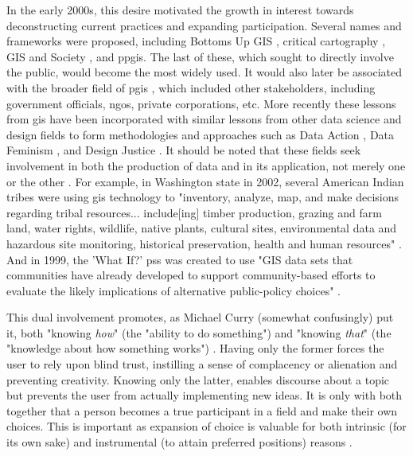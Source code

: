 In the early 2000s, this desire motivated the growth in interest towards deconstructing current practices and expanding participation. Several names and frameworks were proposed, including Bottoms Up GIS \cite{talenBottomUpGIS2000}, critical cartography \cite{cramptonIntroductionCriticalCartography2005, kimCriticalCartographyParticipatory2015}, GIS and Society \cite{sieberPublicParticipationGeographic2006}, and \ac{ppgis}. The last of these, which sought to directly involve the public, would become the most widely used. It would also later be associated with the broader field of \ac{pgis} \cite{sieberPublicParticipationGeographic2006}, which included other stakeholders, including government officials, \acp{ngo}, private corporations, etc. More recently these lessons from \ac{gis} have been incorporated with similar lessons from other data science and design fields to form methodologies and approaches such as Data Action \cite{williamsDataActionUsing2020}, Data Feminism \cite{dignazioDataFeminism2020}, and Design Justice \cite{costanza-chockDesignJusticeCommunityLed2020}. It should be noted that these fields seek involvement in both the production of data and in its application, not merely one or the other \cite{weinerParticipatoryGeographicInformation2007, talenBottomUpGIS2000}. For example, in Washington state in 2002, several American Indian tribes were using \ac{gis} technology to "inventory, analyze, map, and make decisions regarding tribal resources... include[ing] timber production, grazing and farm land, water rights, wildlife, native plants, cultural sites, environmental data and hazardous site monitoring, historical preservation, health and human resources" \cite{bondCherokeeNationTribal2002}. And in 1999, the 'What If?' \ac{pss} was created to use "GIS data sets that communities have already developed to support community-based efforts to evaluate the likely implications of alternative public-policy choices" \cite{klostermanWhatIfCollaborative1999}. 

This dual involvement promotes, as Michael Curry (somewhat confusingly) put it, both "knowing \textit{how}" (the "ability to do something") and "knowing \textit{that}" (the "knowledge about how something works") \cite{curryGeographicalInformationSystems1994}. Having only the former forces the user to rely upon blind trust, instilling a sense of complacency or alienation and preventing creativity. Knowing only the latter, enables discourse about a topic but prevents the user from actually implementing new ideas. It is only with both together that a person becomes a true participant in a field and make their own choices. This is important as expansion of choice is valuable for both intrinsic (for its own sake) and instrumental (to attain preferred positions) reasons \cite{senFreedomChoiceConcept1988}.

